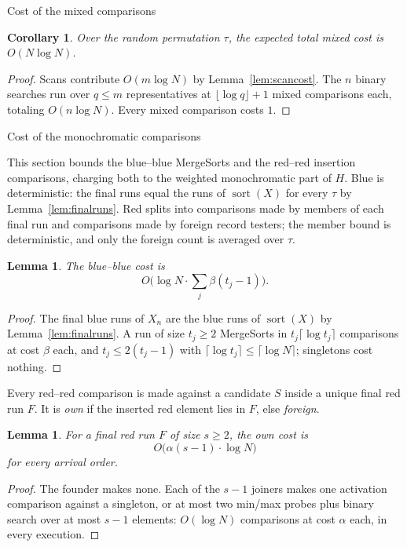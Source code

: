 \documentclass[11pt]{article}
\newtheorem{cor}[thm]{Corollary}
\newtheorem{lem}[thm]{Lemma}
\theoremstyle{definition}
\numberwithin{equation}{section}
\begin{document}
\begin{section}{Cost of the mixed comparisons}
\begin{aiblock}
\begin{cor}\label{cor:mixedcost}
Over the random permutation $\tau$, the expected total mixed cost
is $O(N \log N)$.
\end{cor}
\begin{proof}
Scans contribute $O(m \log N)$ by Lemma~\ref{lem:scancost}. The $n$
binary searches run over $q \le m$ representatives at
$\lfloor\log q\rfloor + 1$ mixed comparisons each, totaling
$O(n \log N)$. Every mixed comparison costs $1$.
\end{proof}
\end{aiblock}
\end{section}

\begin{section}{Cost of the monochromatic comparisons}
\begin{aiblock}
This section bounds the blue--blue {\ttfamily MergeSort}s and the red--red
insertion comparisons, charging both to the weighted monochromatic
part of $H$. Blue is deterministic: the final runs equal the runs of
$\operatorname{sort}(X)$ for every $\tau$ by Lemma~\ref{lem:finalruns}.
Red splits into comparisons made by members of each final run and
comparisons made by foreign record testers; the member bound is
deterministic, and only the foreign count is averaged over $\tau$.

\begin{lem}\label{lem:bluecost}
The blue--blue cost is
$$
O\Big(\log N\cdot\sum_j \beta(t_j-1)\Big).
$$
\end{lem}
\begin{proof}
The final blue runs of $X_n$ are the blue runs of $\operatorname{sort}(X)$ by Lemma~\ref{lem:finalruns}.
A run of size $t_j \ge 2$ {\ttfamily MergeSort}s in
$t_j\lceil\log t_j\rceil$ comparisons at cost $\beta$ each, and
$t_j \le 2(t_j-1)$ with $\lceil\log t_j\rceil \le
\lceil\log N\rceil$; singletons cost nothing.
\end{proof}

Every red--red comparison is made against a candidate $S$ inside a
unique final red run $F$. It is {\em own} if the inserted red element lies
in $F$, else {\em foreign}.

\begin{lem}\label{lem:ownred}
For a final red run $F$ of size $s \ge 2$, the own cost is
$$
O\big(\alpha(s-1)\cdot\log N\big)
$$
for every arrival order.
\end{lem}
\begin{proof}
The founder makes none. Each of the $s-1$ joiners makes one
activation comparison against a singleton, or at most two
min/max probes plus binary search over at most $s-1$ elements:
$O(\log N)$ comparisons at cost $\alpha$ each, in every execution.
\end{proof}


\end{aiblock}
\end{section}
\end{document}
